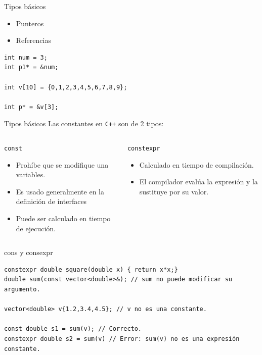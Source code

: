 \documentclass[aspectratio=169,presentation]{beamer}
\begin{document}
\begin{frame}[label={sec:org4fa94ff},fragile]{Tipos básicos}
 \begin{itemize}
\item Punteros
\item Referencias
\end{itemize}
\begin{verbatim}
int num = 3;
int p1* = &num;

int v[10] = {0,1,2,3,4,5,6,7,8,9};

int p* = &v[3];
\end{verbatim}
\end{frame}
\begin{frame}[label={sec:org3db2406},fragile]{Tipos básicos}
 Las constantes en \texttt{C++} son de 2 tipos:
\begin{columns}
\begin{column}{0.48\columnwidth}
\begin{block}{\texttt{const}}
\begin{itemize}
\item Prohíbe que se modifique una variables.
\item Es usado generalmente en la definición de interfaces
\item Puede ser calculado en tiempo de ejecución.
\end{itemize}
\end{block}
\end{column}
\begin{column}{0.48\columnwidth}
\begin{block}{\texttt{constexpr}}
\begin{itemize}
\item Calculado en tiempo de compilación.
\item El compilador evalúa la expresión y la sustituye por su valor.
\end{itemize}
\end{block}
\end{column}
\end{columns}
\end{frame}
\begin{frame}[label={sec:org2e47262},fragile]{cons y consexpr}
 \begin{verbatim}
constexpr double square(double x) { return x*x;}
double sum(const vector<double>&); // sum no puede modificar su argumento.

vector<double> v{1.2,3.4,4.5}; // v no es una constante.

const double s1 = sum(v); // Correcto.
constexpr double s2 = sum(v) // Error: sum(v) no es una expresión constante.

\end{verbatim}
\end{frame}
\end{document}
